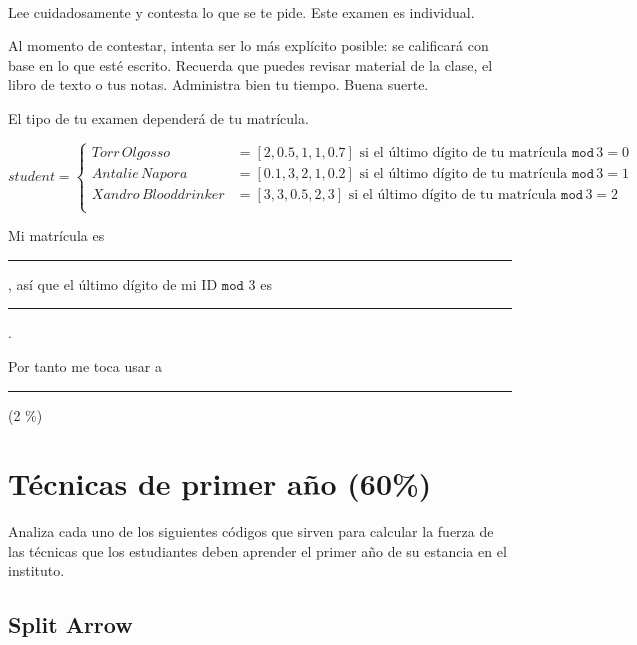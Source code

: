 \documentclass[11pt]{article}
\title{
    \myclass \\
    \textbf{\mytitle} \\
    \myheader
    \date{}
}
\newcommand{\shortresponserule}{{\large\rule{5 cm}{0.3mm}}}
\begin{document}
\maketitle

\vspace{-1.5cm}

Lee cuidadosamente y contesta lo que se te pide.
Este examen es individual.

Al momento de contestar, intenta ser lo más explícito posible: se calificará con base en lo que esté escrito. %
Recuerda que puedes revisar material de la clase, el libro de texto o tus notas.
Administra bien tu tiempo.
Buena suerte.

\vspace{1.5ex}

El tipo de tu examen dependerá de tu matrícula.

$$ student = 
\begin{cases}
   Torr \, Olgosso & = [2, 0.5, 1, 1, 0.7] \text{ si el último dígito de tu matrícula } \mathtt{mod} \, 3 = 0 \\
   Antalie \, Napora & = [0.1, 3, 2, 1, 0.2] \text{ si el último dígito de tu matrícula } \mathtt{mod} \, 3 = 1 \\
   Xandro \, Blooddrinker & = [3, 3, 0.5, 2, 3] \text{ si el último dígito de tu matrícula } \mathtt{mod} \, 3 = 2 \\
\end{cases}
$$

\vspace{1.5ex}

Mi matrícula es \shortresponserule,
así que el último dígito de mi ID $\mathtt{mod}$ 3 es \rule{1cm}{0.4mm}.

Por tanto me toca usar a \shortresponserule \quad (2 \%)

\vspace{1.5ex}

\section{Técnicas de primer año (60\%)}

Analiza cada uno de los siguientes códigos que sirven para calcular la fuerza de las técnicas que los estudiantes deben aprender el primer año de su estancia en el instituto.

\subsection{Split Arrow}
\end{document}
